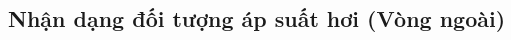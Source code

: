 \documentclass[../main.tex]{subfiles}
\begin{document}





\subsection{Nhận dạng đối tượng áp suất hơi (Vòng ngoài)}
\end{document}

